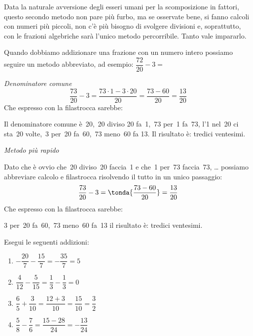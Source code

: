 \begin{osservazione}
 Data la naturale avversione degli esseri umani per la scomposizione in 
fattori, questo secondo metodo non pare più furbo, ma se osservate bene, si 
fanno calcoli con numeri più piccoli, non c'è più bisogno di svolgere 
divisioni e, soprattutto, con le frazioni algebriche sarà l'unico metodo 
percorribile. Tanto vale impararlo.
\end{osservazione}

\begin{esempio}
 Quando dobbiamo addizionare una frazione con un numero intero possiamo 
seguire un metodo abbreviato, ad esempio: 
\(\dfrac{72}{20} - 3 =\)

\emph{Denominatore comune}
\[\dfrac{73}{20} - 3 = \dfrac{73 \cdot 1 - 3 \cdot 20}{20} =
  \dfrac{73 - 60}{20} = \dfrac{13}{20}\]
Che espresso con la filastrocca sarebbe: 

Il denominatore comune è~20,~20 diviso 20 fa~1,~73 per~1 fa~73, 
l'1 nel~20 ci sta~20 volte,~3 per~20 fa~60,~73 meno~60 fa 13.
Il risultato è: tredici ventesimi.

\emph{Metodo più rapido}

Dato che è ovvio che~20 diviso~20 faccia~1 e che~1 per~73 faccia~73, \dots
possiamo abbreviare calcolo e filastrocca risolvendo il tutto in un unico 
passaggio:
\[\dfrac{73}{20} - 3 = \tonda{\dfrac{73 - 60}{20}} = \dfrac{13}{20}\]
Che espresso con la filastrocca sarebbe: 

3 per~20 fa~60,~73 meno~60 fa~13 il risultato è: tredici ventesimi.
\end{esempio}

\begin{esempio}
 Esegui le seguenti addizioni:
 \begin{multicols}{2}
 \begin{enumerate} [noitemsep]
  \item \(-\dfrac{20}{7} -\dfrac{15}{7} = -\dfrac{35}{7} = 5\)
  \item \(\dfrac{4}{12} - \dfrac{5}{15} = \dfrac{1}{3} - \dfrac{1}{3} = 0\)
  \item \(\dfrac{6}{5} + \dfrac{3}{10} = \dfrac{12 + 3}{10} = 
          \dfrac{15}{10} = \dfrac{3}{2}\)
  \item \(\dfrac{5}{8} - \dfrac{7}{6} = \dfrac{15 - 28}{24} = 
          -\dfrac{13}{24}\)
 \end{enumerate}
 \end{multicols}
\end{esempio}

